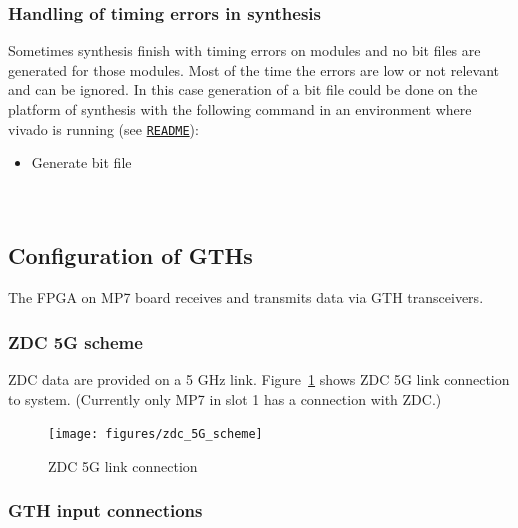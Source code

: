 \subsubsection{Handling of timing errors in synthesis}\label{sec:app:synth_timing_errors}

Sometimes synthesis finish with timing errors on modules and no bit files are generated for those modules.
Most of the time the errors are low or not relevant and can be ignored. In this case generation
of a bit file could be done on the platform of synthesis with the following command in an environment where
vivado is running (see \href{\gitbranch/README.md}{\texttt{README}}):\\
\begin{itemize}
\item Generate bit file\\
\\
\\
\end{itemize}

\clearpage

\subsection{Configuration of GTHs}\label{sec:app:app_a}

The FPGA on MP7 board receives and transmits data via GTH transceivers.\\

\subsubsection{ZDC 5G scheme}\label{sec:app:zdc_5g_scheme}

ZDC data are provided on a 5 GHz link.
Figure~\ref{fig:app:zdc_5G_scheme} shows ZDC 5G link connection to \ugt system. (Currently only MP7 in slot 1 has a connection with ZDC.)\\

\begin{figure}[htb]
\centering
\texttt{[image: figures/zdc\_5G\_scheme]}
\caption{ZDC 5G link connection}
\label{fig:app:zdc_5G_scheme}
\end{figure}

\clearpage

\subsubsection{GTH input connections}\label{sec:app:gth_i_conn}


